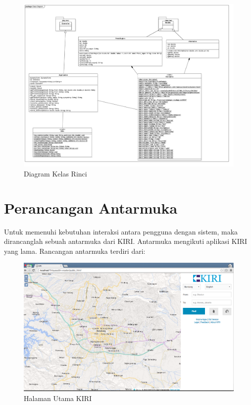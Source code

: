 \begin{figure}[ht]
	\centering
	\includegraphics[scale=0.3]{Gambar/Class-Diagram-Rinci}
	\caption{Diagram Kelas Rinci} 
	\label{fig:4_kelas_diagram_rinci}
\end{figure}


\section{Perancangan Antarmuka}
\label{sec:perancangan_antarmuka}

Untuk memenuhi kebutuhan interaksi antara pengguna dengan sistem, maka dirancanglah sebuah antarmuka dari KIRI. Antarmuka mengikuti aplikasi KIRI yang lama. Rancangan antarmuka terdiri dari:

\begin{figure}[H]
	\centering
	\includegraphics[scale=0.3]{Gambar/KIRI-main}
	\caption{Halaman Utama KIRI} 
	\label{fig:4_KIRI_main}
\end{figure}

